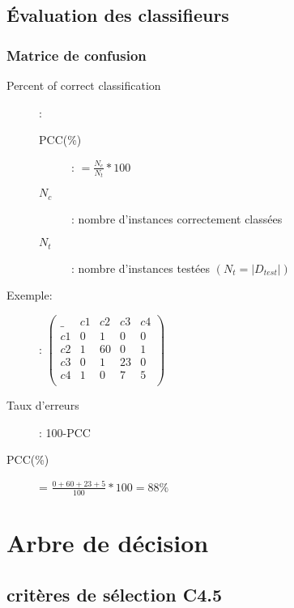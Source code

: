 \section{Évaluation des classifieurs}
\subsection{Matrice de confusion}
\begin{description}
\item[Percent of correct classification]:
\begin{description}
\item[PCC(\%)]: $ = \frac{N_c}{N_t} * 100$
\item[$N_c$]: nombre d'instances correctement classées
\item[$N_t$]: nombre d'instances testées $(N_t = |D_{test}|)$
\end{description} 
\end{description}

Exemple:\\
\begin{description}
\item[]: $\begin{pmatrix}
  \_  & c1 & c2 & c3 & c4 \\
   c1 & 0  & 1  &  0 & 0  \\
   c2 & 1  & 60 &  0 & 1  \\
   c3 & 0  & 1  & 23 & 0  \\
   c4 & 1  & 0  &  7 & 5  \\
\end{pmatrix}$
\item[Taux d'erreurs]: 100-PCC
\item[PCC(\%)] = $ \frac{0+60+23+5}{100} * 100 = 88\% $ 
\end{description}

\chapter{Arbre de décision}
\section{critères de sélection C4.5}

